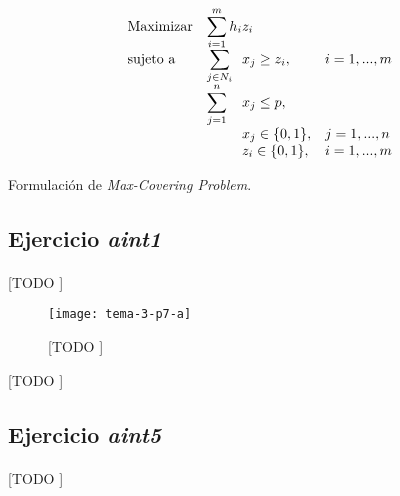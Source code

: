 \documentclass[spanish]{article}
\begin{document}
		\begin{eqfloat}
			\begin{equation}
				\begin{array}{ll@{}ll}
					\text{Maximizar}
						& \displaystyle\sum\limits_{i = 1}^{m} h_{i} & z_{i} 			&							\\
					\text{sujeto a}
						& \displaystyle\sum\limits_{j \in N_i}& x_{j} \geq z_i,		&i=1 ,..., m	\\
						& \displaystyle\sum\limits_{j = 1}^n 	& x_{j} \leq p,  		& 						\\
						&                                     &	x_{j} \in \{0,1\},&j=1 ,..., n 	\\
						&                                     &	z_{i} \in \{0,1\},&i=1 ,..., m  \\
				\end{array}
			\end{equation}
			\caption{Formulación de \emph{Max-Covering Problem}.}
			\label{eq:max_covering}
		\end{eqfloat}


		\subsection{Ejercicio \emph{aint1}}
		\label{sec:e-7a}

			\paragraph{}
			[TODO ]

			\begin{figure}[h]
				\begin{center}
					\texttt{[image: tema-3-p7-a]}
				\end{center}
				\caption{[TODO ]}
				\label{}
			\end{figure}

			\begin{table}[h]
				\begin{center}
				\end{center}
				\caption{[TODO ]}
				\label{}
			\end{table}

		\subsection{Ejercicio \emph{aint5}}
		\label{sec:e-7b}

			\paragraph{}
			[TODO ]
\end{document}

